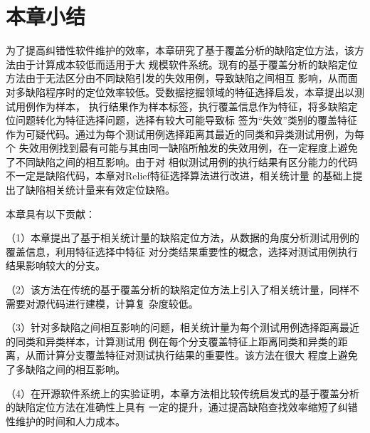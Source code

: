 \section{本章小结}
为了提高纠错性软件维护的效率，本章研究了基于覆盖分析的缺陷定位方法，该方法由于计算成本较低而适用于大
规模软件系统。现有的基于覆盖分析的缺陷定位方法由于无法区分由不同缺陷引发的失效用例，导致缺陷之间相互
影响，从而面对多缺陷程序时的定位效率较低。受数据挖掘领域的特征选择启发，本章提出以测试用例作为样本，
执行结果作为样本标签，执行覆盖信息作为特征，将多缺陷定位问题转化为特征选择问题，选择有较大可能导致标
签为``失效''类别的覆盖特征作为可疑代码。通过为每个测试用例选择距离其最近的同类和异类测试用例，为每个
失效用例找到最有可能与其由同一缺陷所触发的失效用例，在一定程度上避免了不同缺陷之间的相互影响。由于对
相似测试用例的执行结果有区分能力的代码不一定是缺陷代码，本章对Relief特征选择算法进行改进，相关统计量
的基础上提出了缺陷相关统计量来有效定位缺陷。

本章具有以下贡献：

（1）本章提出了基于相关统计量的缺陷定位方法，从数据的角度分析测试用例的覆盖信息，利用特征选择中特征
对分类结果重要性的概念，选择对测试用例执行结果影响较大的分支。

（2）该方法在传统的基于覆盖分析的缺陷定位方法上引入了相关统计量，同样不需要对源代码进行建模，计算复
杂度较低。

（3）针对多缺陷之间相互影响的问题，相关统计量为每个测试用例选择距离最近的同类和异类样本，计算测试用
例在每个分支覆盖特征上距离同类和异类的距离，从而计算分支覆盖特征对测试执行结果的重要性。该方法在很大
程度上避免了多缺陷之间的相互影响。

（4）在开源软件系统上的实验证明，本章方法相比较传统启发式的基于覆盖分析的缺陷定位方法在准确性上具有
一定的提升，通过提高缺陷查找效率缩短了纠错性维护的时间和人力成本。

